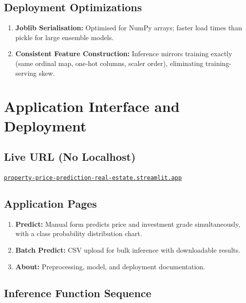 \documentclass[12pt,a4paper]{article}
\begin{document}
\subsection{Deployment Optimizations}

\begin{enumerate}
    \item \textbf{Joblib Serialisation:} Optimised for NumPy arrays; faster
          load times than pickle for large ensemble models.
    \item \textbf{Consistent Feature Construction:} Inference mirrors training
          exactly (same ordinal map, one-hot columns, scaler order), eliminating
          training-serving skew.
\end{enumerate}

\section{Application Interface and Deployment}

\subsection{Live URL (No Localhost)}

\begin{center}
\href{https://property-price-prediction-real-estate.streamlit.app/}%
{\texttt{property-price-prediction-real-estate.streamlit.app}}
\end{center}

\subsection{Application Pages}

\begin{enumerate}
    \item \textbf{Predict:} Manual form predicts price and investment grade
          simultaneously, with a class probability distribution chart.
    \item \textbf{Batch Predict:} CSV upload for bulk inference with
          downloadable results.
    \item \textbf{About:} Preprocessing, model, and deployment documentation.
\end{enumerate}

\subsection{Inference Function Sequence}
\end{document}
